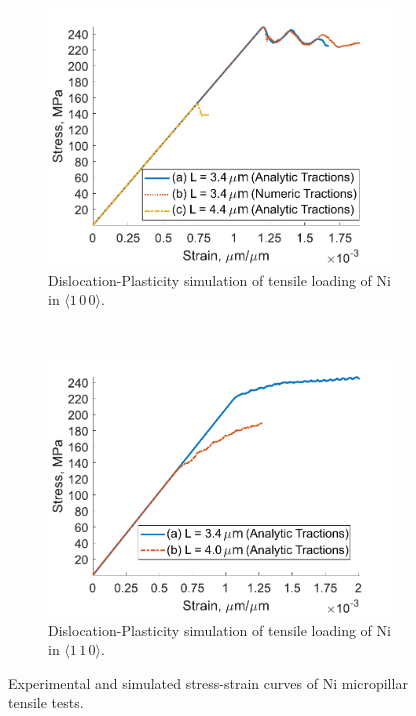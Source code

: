 \begin{figure}
    \begin{subfigure}[t]{0.45\linewidth}
        \centering
        \includegraphics[width=\linewidth]{../data/Ni100_DDD.pdf}
        \caption[Dislocation-Plasticity simulation of tensile loading of Ni in $\langle 1\, 0\, 0 \rangle$.]{Dislocation-Plasticity simulation of tensile loading of Ni in $\langle 1\, 0\, 0 \rangle$.}
        \label{sf:Ni100_DDD}
    \end{subfigure}
    ~
    \begin{subfigure}[t]{0.45\linewidth}
        \centering
        \includegraphics[width=\linewidth]{../data/Ni110_DDD.pdf}
        \caption[Dislocation-Plasticity simulation of tensile loading of Ni in $\langle 1\, 1\, 0 \rangle$.]{Dislocation-Plasticity simulation of tensile loading of Ni  in $\langle 1\, 1\, 0 \rangle$.}
        \label{sf:Ni110_DDD}
    \end{subfigure}
    \caption{Experimental and simulated stress-strain curves of Ni micropillar tensile tests.}
    \label{f:NiStrainStress}
\end{figure}

